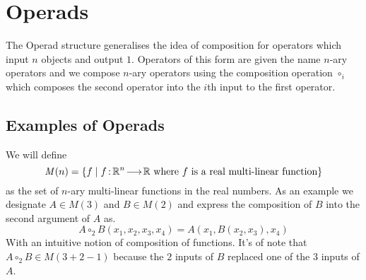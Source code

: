 
\chapter{Operads}

The Operad structure generalises the idea of composition for operators which input \( n \) objects and output \( 1 \). 
Operators of this form are given the name \( n \)-ary operators and we compose \( n \)-ary operators using the composition operation \( \circ_i \) which composes the second operator into the \( i \)th input to the first operator.

\section{Examples of Operads}  \label{sec:examples}

\begin{Example}
We will define
\[ \mathit{M}(n) = \{ f \mid f \,{:}\,\mathbb{R}^n\!\longrightarrow\!\mathbb{R} \text{ where \( f \) is a real multi-linear function} \} \]
as the set of \( n \)-ary multi-linear functions in the real numbers.
As an example we designate \( A \in \mathit{M}(3) \) and \( B \in \mathit{M}(2) \) and express the composition of \( B \) into the second argument of \( A \) as.
\[ A \circ_2 B (x_1, x_2, x_3, x_4) = A(x_1, B(x_2, x_3), x_4) \]
With an intuitive notion of composition of functions. 
It's of note that \( A \circ_2 B \in \mathit{M}(3 + 2 - 1) \) because the \( 2 \) inputs of \( B \) replaced one of the \( 3 \) inputs of \( A \). 
\end{Example}

